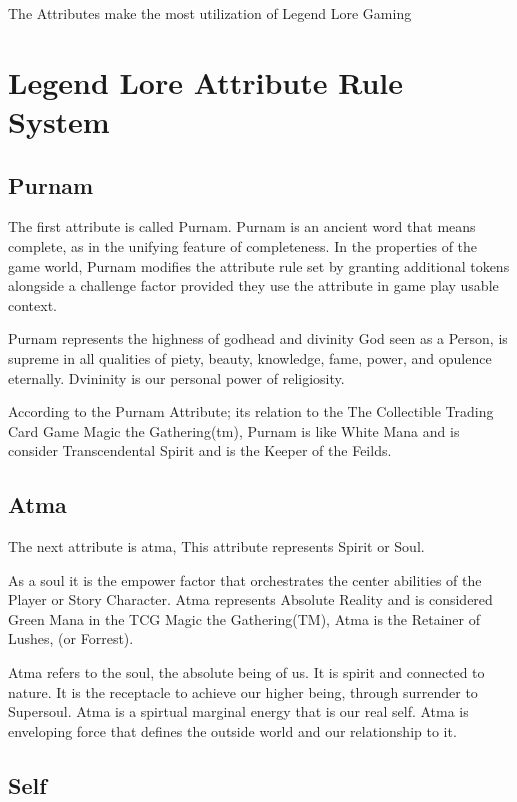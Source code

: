 \documentclass{article}
\begin{document}
The Attributes make the most utilization of Legend Lore Gaming

\section{Legend Lore Attribute Rule System}

\subsection{Purnam}

The first attribute is called Purnam. Purnam is an ancient word that means complete, as in the unifying feature of completeness. In the properties of the game world, Purnam modifies the attribute rule set by granting additional tokens alongside a challenge factor provided they use the attribute in game play usable context.

Purnam represents the highness of godhead and divinity God seen as a Person, is supreme in all qualities of piety, beauty, knowledge, fame, power, and opulence eternally. Dvininity is our personal power of religiosity.

According to the Purnam Attribute; its relation to the The Collectible Trading Card Game Magic the Gathering(tm), Purnam is like White Mana and is consider Transcendental Spirit and is the Keeper of the Feilds.

\subsection{Atma}

The next attribute is atma, This attribute represents Spirit or Soul.

As a soul it is the empower factor that orchestrates the center abilities of the Player or Story Character. Atma represents Absolute Reality and is considered Green Mana in the TCG Magic the Gathering(TM),  Atma is the Retainer of Lushes, (or Forrest).

Atma refers to the soul, the absolute being of us. It is spirit and connected to nature. It is the receptacle to achieve our higher being, through surrender to Supersoul. Atma is a spirtual marginal energy that is our real self. Atma is enveloping force that defines the outside world and our relationship to it.


\subsection{Self}
\end{document}
